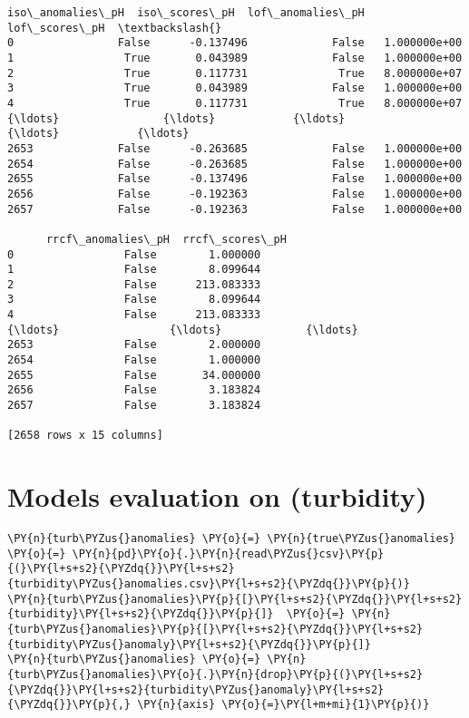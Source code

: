 \begin{tcolorbox}[breakable, size=fbox, boxrule=.5pt, pad at break*=1mm, opacityfill=0]
\begin{Verbatim}[commandchars=\\\{\}]
      iso\_anomalies\_pH  iso\_scores\_pH  lof\_anomalies\_pH  lof\_scores\_pH  \textbackslash{}
0                False      -0.137496             False   1.000000e+00
1                 True       0.043989             False   1.000000e+00
2                 True       0.117731              True   8.000000e+07
3                 True       0.043989             False   1.000000e+00
4                 True       0.117731              True   8.000000e+07
{\ldots}                {\ldots}            {\ldots}               {\ldots}            {\ldots}
2653             False      -0.263685             False   1.000000e+00
2654             False      -0.263685             False   1.000000e+00
2655             False      -0.137496             False   1.000000e+00
2656             False      -0.192363             False   1.000000e+00
2657             False      -0.192363             False   1.000000e+00

      rrcf\_anomalies\_pH  rrcf\_scores\_pH
0                 False        1.000000
1                 False        8.099644
2                 False      213.083333
3                 False        8.099644
4                 False      213.083333
{\ldots}                 {\ldots}             {\ldots}
2653              False        2.000000
2654              False        1.000000
2655              False       34.000000
2656              False        3.183824
2657              False        3.183824

[2658 rows x 15 columns]
\end{Verbatim}
\end{tcolorbox}
        
    \hypertarget{models-evaluation-on-turbidity}{%
\section{Models evaluation on
(turbidity)}\label{models-evaluation-on-turbidity}}

    \begin{tcolorbox}[breakable, size=fbox, boxrule=1pt, pad at break*=1mm,colback=cellbackground, colframe=cellborder]
\begin{Verbatim}[commandchars=\\\{\}]
\PY{n}{turb\PYZus{}anomalies} \PY{o}{=} \PY{n}{true\PYZus{}anomalies}  \PY{o}{=} \PY{n}{pd}\PY{o}{.}\PY{n}{read\PYZus{}csv}\PY{p}{(}\PY{l+s+s2}{\PYZdq{}}\PY{l+s+s2}{turbidity\PYZus{}anomalies.csv}\PY{l+s+s2}{\PYZdq{}}\PY{p}{)}
\PY{n}{turb\PYZus{}anomalies}\PY{p}{[}\PY{l+s+s2}{\PYZdq{}}\PY{l+s+s2}{turbidity}\PY{l+s+s2}{\PYZdq{}}\PY{p}{]}  \PY{o}{=} \PY{n}{turb\PYZus{}anomalies}\PY{p}{[}\PY{l+s+s2}{\PYZdq{}}\PY{l+s+s2}{turbidity\PYZus{}anomaly}\PY{l+s+s2}{\PYZdq{}}\PY{p}{]}
\PY{n}{turb\PYZus{}anomalies} \PY{o}{=} \PY{n}{turb\PYZus{}anomalies}\PY{o}{.}\PY{n}{drop}\PY{p}{(}\PY{l+s+s2}{\PYZdq{}}\PY{l+s+s2}{turbidity\PYZus{}anomaly}\PY{l+s+s2}{\PYZdq{}}\PY{p}{,} \PY{n}{axis} \PY{o}{=}\PY{l+m+mi}{1}\PY{p}{)}
\end{Verbatim}
\end{tcolorbox}

